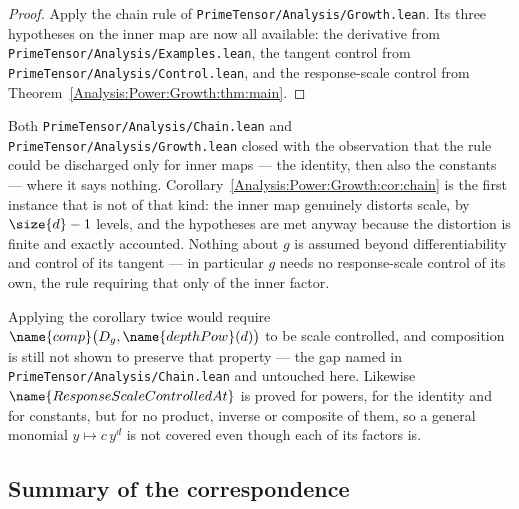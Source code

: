 \begin{proof}
Apply the chain rule of \texttt{PrimeTensor/Analysis/Growth.lean}.  Its three
hypotheses on the inner map are now all available: the derivative from
\texttt{PrimeTensor/Analysis/Examples.lean}, the tangent control from
\texttt{PrimeTensor/Analysis/Control.lean}, and the response-scale control from
Theorem~\ref{Analysis:Power:Growth:thm:main}.
\end{proof}

\begin{remark}
\label{Analysis:Power:Growth:rem:first}
Both \texttt{PrimeTensor/Analysis/Chain.lean} and
\texttt{PrimeTensor/Analysis/Growth.lean} closed with the observation that the
rule could be discharged only for inner maps --- the identity, then also the
constants --- where it says nothing.  Corollary~\ref{Analysis:Power:Growth:cor:chain}
is the first instance that is not of that kind: the inner map genuinely
distorts scale, by $\size{d}-1$ levels, and the hypotheses are met anyway
because the distortion is finite and exactly accounted.  Nothing about $g$ is
assumed beyond differentiability and control of its tangent --- in particular
$g$ needs no response-scale control of its own, the rule requiring that only of
the inner factor.
\end{remark}

\begin{remark}\label{Analysis:Power:Growth:rem:no-iterate}
Applying the corollary twice would require
$\name{comp}\bigl(D_g, \name{depthPow}(d)\bigr)$ to be scale controlled, and
composition is still not shown to preserve that property --- the gap named in
\texttt{PrimeTensor/Analysis/Chain.lean} and untouched here.  Likewise
$\name{ResponseScaleControlledAt}$ is proved for powers, for the identity and
for constants, but for no product, inverse or composite of them, so a general
monomial $y \mapsto c\,y^{d}$ is not covered even though each of its factors
is.
\end{remark}

\subsection*{Summary of the correspondence}

